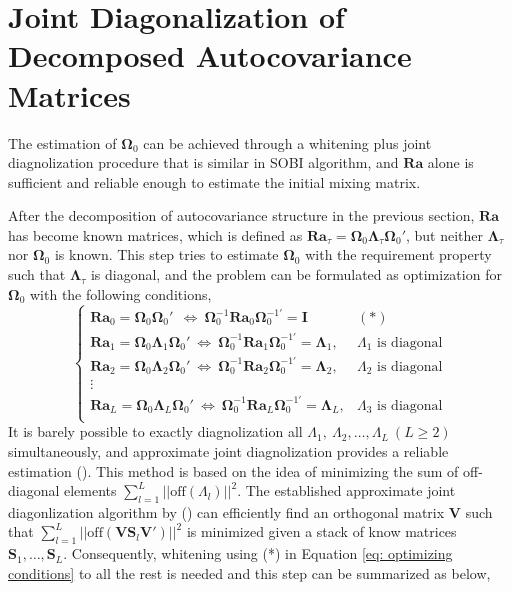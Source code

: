 \documentclass[utf8,english]{gradu3}
\begin{document}
\section{Joint Diagonalization of Decomposed Autocovariance Matrices}

The estimation of $\boldsymbol\Omega_0$ can be achieved through a whitening plus joint diagnolization procedure that is similar in SOBI algorithm, and $\boldsymbol{Ra}$ alone is sufficient and reliable enough to estimate the initial mixing matrix.

After the decomposition of autocovariance structure in the previous section, $\boldsymbol{Ra}$ has become known matrices, which is defined as $\boldsymbol{Ra}_\tau= \boldsymbol{\Omega}_0 \boldsymbol{\Lambda}_\tau\boldsymbol\Omega_0'$, but neither $\boldsymbol\Lambda_\tau$ nor $\boldsymbol\Omega_0$ is known. This step tries to estimate $\boldsymbol{\Omega}_0$ with the requirement property such that $\boldsymbol{\Lambda}_\tau$ is diagonal, and the problem can be formulated as optimization for $\boldsymbol{\Omega}_0$ with the following conditions,
\begin{equation}
\label{eq: optimizing conditions}
    \begin{cases}
    \boldsymbol{Ra}_0 = \boldsymbol{\Omega}_0 \boldsymbol{\Omega}_0'  \ \ \Leftrightarrow\ \boldsymbol{\Omega}_0^{-1} \boldsymbol{Ra}_0 \boldsymbol{\Omega}_0^{-1'} = \boldsymbol{I} &(*) \\
    \boldsymbol{Ra}_1 = \boldsymbol{\Omega}_0 \boldsymbol{\Lambda}_1 \boldsymbol{\Omega}_0'\ \Leftrightarrow\ \boldsymbol{\Omega}_0^{-1} \boldsymbol{Ra}_1 \boldsymbol{\Omega}_0^{-1'} = \boldsymbol{\Lambda}_1 ,  & \Lambda_1 \text{ is diagonal}\\
    \boldsymbol{Ra}_2 = \boldsymbol{\Omega}_0 \boldsymbol{\Lambda}_2 \boldsymbol{\Omega}_0' \ \Leftrightarrow\ \boldsymbol{\Omega}_0^{-1} \boldsymbol{Ra}_2 \boldsymbol{\Omega}_0^{-1'} = \boldsymbol{\Lambda}_2,  & \Lambda_2 \text{ is diagonal}\\
    \vdots \\
    \boldsymbol{Ra}_L = \boldsymbol{\Omega}_0 \boldsymbol{\Lambda}_L \boldsymbol{\Omega}_0' \ \Leftrightarrow\ \boldsymbol{\Omega}_0^{-1} \boldsymbol{Ra}_L \boldsymbol{\Omega}_0^{-1'} = \boldsymbol{\Lambda}_L,  & \Lambda_3 \text{ is diagonal}\\
    \end{cases}
\end{equation}
It is barely possible to exactly diagnolization all $\Lambda_1,\ \Lambda_2, \dots, \Lambda_L\ (L\geq 2)$ simultaneously, and approximate joint diagnolization provides a reliable estimation (\cite{miettinen2016separation}). This method is based on the idea of minimizing the sum of off-diagonal elements $\sum_{l=1}^L ||\text{off}(\Lambda_l)||^2$. The established approximate joint diagonlization algorithm by \citeauthor{miettinen2017blind} (\citeyear{miettinen2017blind}) can efficiently find an orthogonal matrix $\boldsymbol{V}$ such that $\sum_{l=1}^L||\text{off}(\boldsymbol{VS}_l \boldsymbol{V}')||^2$ is minimized given a stack of know matrices $\boldsymbol S_1,\dots, \boldsymbol S_L$. Consequently, whitening using (*) in Equation \ref{eq: optimizing conditions} to all the rest is needed and this step can be summarized as below,
\end{document}
